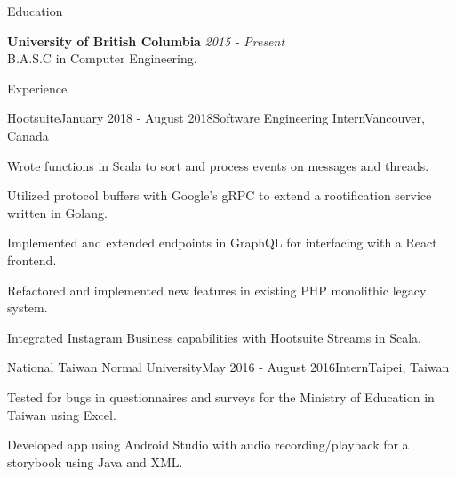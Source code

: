 \documentclass{resume} %
\begin{document}

\begin{rSection}{Education}

{\bf University of British Columbia} \hfill {\em 2015 - Present} \\ 
B.A.S.C in Computer Engineering.

\end{rSection}
\begin{rSection}{Experience}

\begin{rSubsection}{Hootsuite}{January 2018 - August 2018}{Software Engineering Intern}{Vancouver, Canada}
\item Wrote functions in Scala to sort and process events on messages and threads.
\item Utilized protocol buffers with Google's gRPC to extend a rootification service written in Golang.
\item Implemented and extended endpoints in GraphQL for interfacing with a React frontend.
\item Refactored and implemented new features in existing PHP monolithic legacy system.
\item Integrated Instagram Business capabilities with Hootsuite Streams in Scala.  
\end{rSubsection}
\begin{rSubsection}{National Taiwan Normal University}{May 2016 - August 2016}{Intern}{Taipei, Taiwan}
\item Tested for bugs in questionnaires and surveys for the Ministry of Education in Taiwan using Excel.
\item Developed app using Android Studio with audio recording/playback for a storybook using Java and XML.
\end{rSubsection}

\end{rSection}


\end{document}
